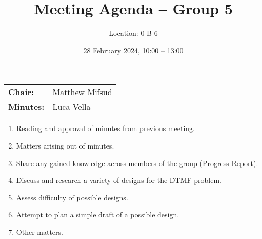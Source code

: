 \documentclass{cce2014-meetings}
\title{Meeting Agenda -- Group 5}
\author{Location: 0 B 6}
\date{28 February 2024, 10:00 -- 13:00}
\begin{document}
\maketitle
\begin{center}
\begin{tabular}{ll}
\textbf{Chair:}   & Matthew Mifsud \\
\textbf{Minutes:} & Luca Vella
\end{tabular}
\end{center}

\begin{enumerate}

\item Reading and approval of minutes from previous meeting.

\item Matters arising out of minutes.

\item Share any gained knowledge across members of the group (Progress Report).

\item Discuss and research a variety of designs for the DTMF problem.

\item Assess difficulty of possible designs.

\item Attempt to plan a simple draft of a possible design.

\item Other matters.

\end{enumerate}
\end{document}
